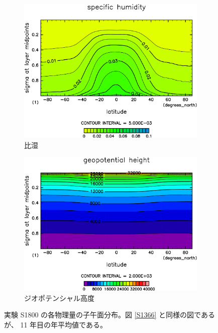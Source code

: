 \documentclass[body]{subfiles}
\begin{document}
\begin{figure}[t]
\begin{subfigure}{.4\textwidth}
		\includegraphics[width=\textwidth]{S1800/QH2OVap,time=3650:4015-crop-rotate.pdf}
		\caption{比湿\hmu*{[kg/kg]}}\label{S1800比湿}
	\end{subfigure}
	\begin{subfigure}{.4\textwidth}
		\centering
		\includegraphics[width=\textwidth]{S1800/Height,time=3650:4015-crop-rotate.pdf}
		\caption{ジオポテンシャル高度\hmu*{[m]}}\label{S1800ジオポテンシャル高度}
	\end{subfigure}
	\caption[実験 S1800 の各物理量の子午面分布]{
		実験 S1800 の各物理量の子午面分布。図 \ref{S1366} と同様の図であるが、
		11 年目の年平均値である。
	}\label{S1800}
\end{figure}
\end{document}

